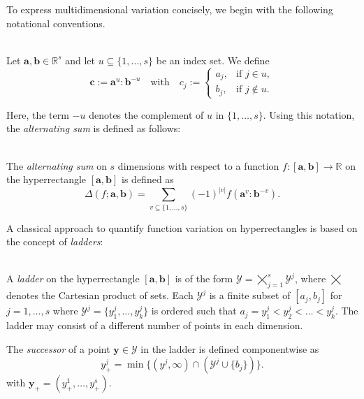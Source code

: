 To express multidimensional variation concisely, we begin with the following
notational conventions.

\begin{definition} \ \\
    \label{def:component_merge}
    Let $\boldsymbol{a}, \boldsymbol{b} \in \mathbb{R}^s$ and let $u \subseteq
    \{1, \dots, s\}$ be an index set. We define
    \begin{equation*}
        \boldsymbol{c} := \boldsymbol{a}^u : \boldsymbol{b}^{-u}
        \quad \text{with} \quad
        c_j := 
        \begin{cases}
            a_j, & \text{if } j \in u, \\
            b_j, & \text{if } j \notin u.
        \end{cases}
    \end{equation*}
\end{definition}

Here, the term $-u$ denotes the complement of $u$ in $\{1, \dots, s\}$. Using
this notation, the \emph{alternating sum} is defined as follows:

\begin{definition} \ \\
    \label{def:alternating_sum}
    The \emph{alternating sum} on $s$ dimensions with respect to a function $f:[\boldsymbol{a},\boldsymbol{b}] \to \mathbb{R}$ on
    the hyperrectangle $[\boldsymbol{a},\boldsymbol{b}]$ is defined as
    \begin{equation*}
        \Delta(f; \boldsymbol{a}, \boldsymbol{b}) = \sum_{v \subseteq \{1,\dots,s\}} (-1)^{|v|} f(\boldsymbol{a}^v:\boldsymbol{b}^{-v}).
    \end{equation*}
\end{definition}

A classical approach to quantify function variation on hyperrectangles is based
on the concept of \emph{ladders}:

\begin{definition}[Ladder] \ \\
    A \emph{ladder} on the hyperrectangle $[\boldsymbol{a},\boldsymbol{b}]$ is of the form $\mathcal{Y} =
    \varprod\limits_{j=1}^s \mathcal{Y}^j$, where $\varprod$ denotes the Cartesian product of sets. Each $\mathcal{Y}^j$ is a finite
    subset of $[a_j, b_j]$ for $j = 1, \dots, s$ where $\mathcal{Y}^j = \{y_1^j,
    \dots, y_k^j\}$ is ordered such that $a_j = y_1^j < y_2^j < \dots < y_k^j$.
    The ladder may consist of a different number of points in each dimension.

    The \emph{successor} of a point $\boldsymbol{y} \in \mathcal{Y}$ in the ladder is defined
    componentwise as
    \begin{equation*}
        y_+^j = \min \big\{(y^j,\infty) \cap (\mathcal{Y}^j \cup \{b_j\}) 
        \big\}.
    \end{equation*}
    with $\boldsymbol{y}_+ = (y_+^1, \dots, y_+^s)$.
\end{definition}

